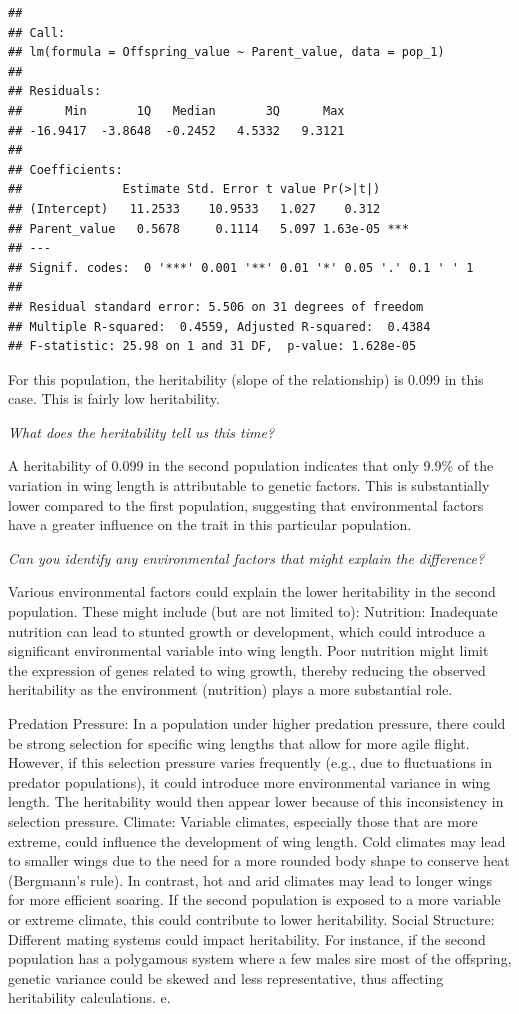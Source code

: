 \documentclass[
  a4paper]{book}
\begin{document}
\begin{verbatim}
## 
## Call:
## lm(formula = Offspring_value ~ Parent_value, data = pop_1)
## 
## Residuals:
##      Min       1Q   Median       3Q      Max 
## -16.9417  -3.8648  -0.2452   4.5332   9.3121 
## 
## Coefficients:
##              Estimate Std. Error t value Pr(>|t|)    
## (Intercept)   11.2533    10.9533   1.027    0.312    
## Parent_value   0.5678     0.1114   5.097 1.63e-05 ***
## ---
## Signif. codes:  0 '***' 0.001 '**' 0.01 '*' 0.05 '.' 0.1 ' ' 1
## 
## Residual standard error: 5.506 on 31 degrees of freedom
## Multiple R-squared:  0.4559, Adjusted R-squared:  0.4384 
## F-statistic: 25.98 on 1 and 31 DF,  p-value: 1.628e-05
\end{verbatim}

For this population, the heritability (slope of the relationship) is 0.099 in this case. This is fairly low heritability.

\emph{What does the heritability tell us this time?}

A heritability of 0.099 in the second population indicates that only 9.9\% of the variation in wing length is attributable to genetic factors. This is substantially lower compared to the first population, suggesting that environmental factors have a greater influence on the trait in this particular population.

\emph{Can you identify any environmental factors that might explain the difference?}

Various environmental factors could explain the lower heritability in the second population. These might include (but are not limited to):
Nutrition: Inadequate nutrition can lead to stunted growth or development, which could introduce a significant environmental variable into wing length. Poor nutrition might limit the expression of genes related to wing growth, thereby reducing the observed heritability as the environment (nutrition) plays a more substantial role.

Predation Pressure: In a population under higher predation pressure, there could be strong selection for specific wing lengths that allow for more agile flight. However, if this selection pressure varies frequently (e.g., due to fluctuations in predator populations), it could introduce more environmental variance in wing length. The heritability would then appear lower because of this inconsistency in selection pressure.
Climate: Variable climates, especially those that are more extreme, could influence the development of wing length. Cold climates may lead to smaller wings due to the need for a more rounded body shape to conserve heat (Bergmann's rule). In contrast, hot and arid climates may lead to longer wings for more efficient soaring. If the second population is exposed to a more variable or extreme climate, this could contribute to lower heritability.
Social Structure: Different mating systems could impact heritability. For instance, if the second population has a polygamous system where a few males sire most of the offspring, genetic variance could be skewed and less representative, thus affecting heritability calculations.
e.
\end{document}
